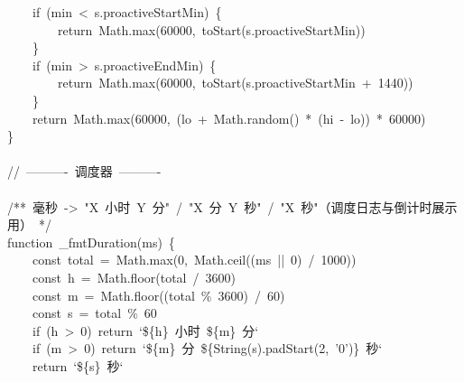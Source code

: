 \documentclass[a4paper,10pt]{article}
\begin{document}
{~~~~if~(min~<~s.proactiveStartMin)~\{\\
~~~~~~~~return~Math.max(60000,~toStart(s.proactiveStartMin))\\
~~~~\}\\
~~~~if~(min~>~s.proactiveEndMin)~\{\\
~~~~~~~~return~Math.max(60000,~toStart(s.proactiveStartMin~+~1440))\\
~~~~\}\\
~~~~return~Math.max(60000,~(lo~+~Math.random()~*~(hi~-~lo))~*~60000)\\
\}\\
\mbox{}\\
//~----------~调度器~----------\\
\mbox{}\\
/**~毫秒~->~"X~小时~Y~分"~/~"X~分~Y~秒"~/~"X~秒"（调度日志与倒计时展示用）~*/\\
function~\_fmtDuration(ms)~\{\\
~~~~const~total~=~Math.max(0,~Math.ceil((ms~||~0)~/~1000))\\
~~~~const~h~=~Math.floor(total~/~3600)\\
~~~~const~m~=~Math.floor((total~\%~3600)~/~60)\\
~~~~const~s~=~total~\%~60\\
~~~~if~(h~>~0)~return~`\$\{h\}~小时~\$\{m\}~分`\\
~~~~if~(m~>~0)~return~`\$\{m\}~分~\$\{String(s).padStart(2,~'0')\}~秒`\\
~~~~return~`\$\{s\}~秒`
}

\newpage
\end{document}
